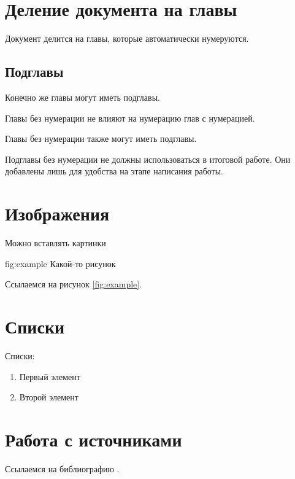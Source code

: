 \documentclass[a4paper,14pt]{extarticle}
\begin{document}


\newpage
\tableofcontents

\section{Деление документа на главы}

Документ делится на главы, которые автоматически нумеруются.

\subsection{Подглавы}

Конечно же главы могут иметь подглавы.


Главы без нумерации не влияют на нумерацию глав с нумерацией.


Главы без нумерации также могут иметь подглавы.

Подглавы без нумерации не должны использоваться в итоговой работе.
Они добавлены лишь для удобства на этапе написания работы.

\section{Изображения}

Можно вставлять картинки

{fig:example}
{Какой-то рисунок}

Ссылаемся на рисунок \ref{fig:example}.

\section{Списки}

Списки:

\begin{enumerate}
    \item Первый элемент
    \item Второй элемент
\end{enumerate}

\section{Работа с источниками}

Ссылаемся на библиографию \cite{aho1974}.

\custombibliography
\end{document}

